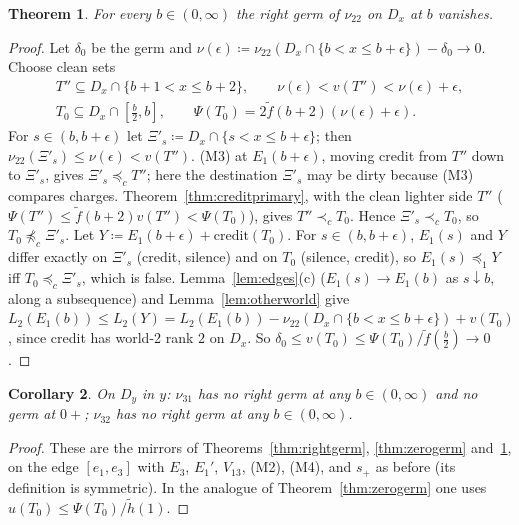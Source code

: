 \documentclass[11pt]{article}
\newtheorem{theorem}{Theorem}
\newtheorem{corollary}[theorem]{Corollary}
\theoremstyle{definition}\newtheorem{definition}[theorem]{Definition}
\theoremstyle{remark}\newtheorem{remark}[theorem]{Remark}
\newcommand{\cred}{\mathrm{credit}}
\newcommand{\Band}{\Xi}
\newcommand{\ftil}{\tilde f}
\newcommand{\htil}{\tilde h}
\begin{document}
\begin{theorem}\label{thm:rightgerm22}
For every $b\in(0,\infty)$ the right germ of $\nu_{22}$ on $D_x$ at $b$
vanishes.
\end{theorem}
\begin{proof}
Let $\delta_0$ be the germ and $\nu(\epsilon)\coloneqq\nu_{22}(D_x\cap
\{b<x\le b+\epsilon\})-\delta_0\to0$. Choose clean sets
\begin{gather*}
 T''\subseteq D_x\cap\{b+1<x\le b+2\},\qquad\nu(\epsilon)<v(T'')<
 \nu(\epsilon)+\epsilon,\\
 T_0\subseteq D_x\cap[\tfrac b2,b],\qquad\Psi(T_0)=2\ftil(b+2)(\nu(\epsilon)+
 \epsilon).
\end{gather*}
For $s\in(b,b+\epsilon)$ let $\Band'_s\coloneqq D_x\cap\{s<x\le b+\epsilon\}$;
then $\nu_{22}(\Band'_s)\le\nu(\epsilon)<v(T'')$. (M3) at $E_1(b+\epsilon)$,
moving credit from $T''$ down to $\Band'_s$, gives $\Band'_s\preceq_cT''$;
here the destination $\Band'_s$ may be dirty because (M3) compares charges.
Theorem~\ref{thm:creditprimary}, with the clean lighter side $T''$
($\Psi(T'')\le\ftil(b+2)v(T'')<\Psi(T_0)$), gives $T''\prec_cT_0$. Hence
$\Band'_s\prec_cT_0$, so $T_0\not\preceq_c\Band'_s$. Let
$Y\coloneqq E_1(b+\epsilon)+\cred(T_0)$. For $s\in(b,b+\epsilon)$, $E_1(s)$
and $Y$ differ exactly on $\Band'_s$ (credit, silence) and on $T_0$
(silence, credit), so $E_1(s)\preceq_1Y$ iff $T_0\preceq_c\Band'_s$, which is
false. Lemma~\ref{lem:edges}(c) ($E_1(s)\to E_1(b)$ as $s\downarrow b$,
along a subsequence) and
Lemma~\ref{lem:otherworld} give $L_2(E_1(b))\le L_2(Y)=L_2(E_1(b))-
\nu_{22}(D_x\cap\{b<x\le b+\epsilon\})+v(T_0)$, since credit has world-2 rank
$2$ on $D_x$. So $\delta_0\le v(T_0)\le\Psi(T_0)/\ftil(\frac b2)\to0$.
\end{proof}

\begin{corollary}\label{cor:mirrorgerms}
On $D_y$ in $y$: $\nu_{31}$ has no right germ at any $b\in(0,\infty)$ and no
germ at $0+$; $\nu_{32}$ has no right germ at any $b\in(0,\infty)$.
\end{corollary}
\begin{proof}
These are the mirrors of Theorems~\ref{thm:rightgerm}, \ref{thm:zerogerm}
and~\ref{thm:rightgerm22}, on the edge $[e_1,e_3]$ with $E_3$, $E_1'$,
$V_{13}$, (M2), (M4), and $s_+$ as before (its definition is symmetric). In
the analogue of Theorem~\ref{thm:zerogerm} one uses
$u(T_0)\le\Psi(T_0)/\htil(1)$.
\end{proof}
\end{document}
